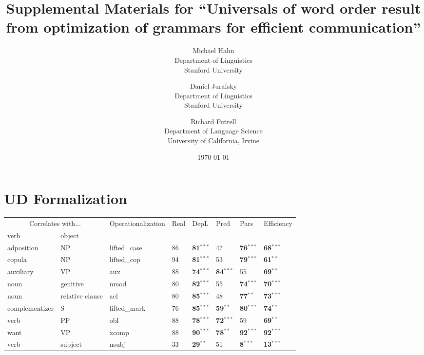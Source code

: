 \documentclass[12pt]{article}
\title{Supplemental Materials for ``Universals of word order result from optimization of grammars for efficient communication''}
\author{
        Michael Hahn \\
                Department of Linguistics\\
       Stanford University
            \and
       Daniel Jurafsky\\
       Department of Linguistics\\
       Stanford University \\
       \and
       Richard Futrell\\
       Department of Language Science\\
       University of California, Irvine
}
\date{\today}
\begin{document}
\maketitle

\section{UD Formalization}


\begin{table}
	\begin{center}
\begin{tabular}{|ll|l|l|l|ll|l|}
	\hline
	\multicolumn{2}{|c|}{Correlates with...}   &          \multirow{2}{*}{Operationalization}       &     \multirow{2}{*}{Real}   & \multirow{2}{*}{DepL}  & \multirow{2}{*}{Pred}   &  \multirow{2}{*}{Pars} &  \multirow{2}{*}{Efficiency}  \\ 
	verb & object &      & & & &  & \\ \hline \hline %
adposition    &    NP    &    lifted\_case    &    86    &    \textbf{81}$^{***}$    &    47    &    \textbf{76}$^{***}$    &    \textbf{68}$^{***}$   \\
copula    &    NP    &    lifted\_cop    &    94    &    \textbf{81}$^{***}$    &    53    &    \textbf{79}$^{***}$    &    \textbf{61}$^{**}$   \\
auxiliary    &    VP    &    aux    &    88    &    \textbf{74}$^{***}$    &    \textbf{84}$^{***}$    &    55    &    \textbf{69}$^{**}$   \\
noun    &    genitive    &    nmod    &    80    &    \textbf{82}$^{***}$    &    55    &    \textbf{74}$^{***}$    &    \textbf{70}$^{***}$   \\
noun    &    relative clause    &    acl    &    80    &    \textbf{85}$^{***}$    &    48    &    \textbf{77}$^{**}$    &    \textbf{73}$^{***}$   \\
complementizer    &    S    &    lifted\_mark    &    76    &    \textbf{85}$^{***}$    &    \textbf{59}$^{**}$    &    \textbf{80}$^{***}$    &    \textbf{74}$^{**}$   \\
verb    &    PP    &    obl    &    88    &    \textbf{78}$^{***}$    &    \textbf{72}$^{***}$    &    59    &    \textbf{69}$^{**}$   \\
want    &    VP    &    xcomp    &    88    &    \textbf{90}$^{***}$    &    \textbf{78}$^{**}$    &    \textbf{92}$^{***}$    &    \textbf{92}$^{***}$   \\
verb    &    subject    &    nsubj    &    33    &    \textbf{29}$^{**}$    &    51    &    \textbf{8}$^{***}$    &    \textbf{13}$^{***}$   \\

\end{tabular}
\end{center}
\end{table}
\end{document}
